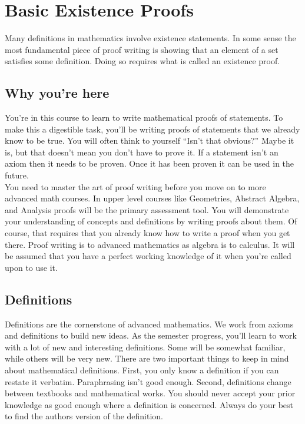 \chapter{Basic Existence Proofs}

Many definitions in mathematics involve existence statements.  In some sense the most fundamental piece of proof writing is showing that an element of a set satisfies some definition.  Doing so requires what is called an existence proof.

\begin{center}
\end{center}

\section{Why you're here}  

You're in this course to learn to write mathematical proofs of statements.  To make this a digestible task, you'll be writing proofs of statements that we already know to be true.  You will often think to yourself ``Isn't that obvious?''  Maybe it is, but that doesn't mean you don't have to prove it.  If a statement isn't an axiom then it needs to be proven.  Once it has been proven it can be used in the future.\\

You need to master the art of proof writing before you move on to more advanced math courses.  In upper level courses like Geometries, Abstract Algebra, and Analysis proofs will be the primary assessment tool.  You will demonstrate your understanding of concepts and definitions by writing proofs about them.  Of course, that requires that you already know how to write a proof when you get there.  Proof writing is to advanced mathematics as algebra is to calculus.  It will be assumed that you have a perfect working knowledge of it when you're called upon to use it.  \\

\section{Definitions}

Definitions are the cornerstone of advanced mathematics.  We work from axioms and definitions to build new ideas.  As the semester progress, you'll learn to work with a lot of new and interesting definitions.  Some will be somewhat familiar, while others will be very new.  There are two important things to keep in mind about mathematical definitions.  First, you only know a definition if you can restate it verbatim.  Paraphrasing isn't good enough.  Second, definitions change between textbooks and mathematical works.  You should never accept your prior knowledge as good enough where a definition is concerned.  Always do your best to find the authors version of the definition.\\

